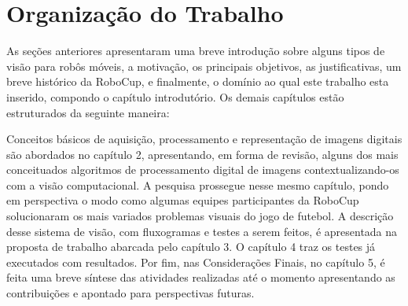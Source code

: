 \section{Organização do Trabalho}

As seções anteriores apresentaram uma breve introdução sobre alguns tipos de visão para robôs móveis, a motivação, os principais objetivos, as justificativas, um breve histórico da RoboCup, e finalmente, o domínio ao qual este trabalho esta inserido, compondo o capítulo introdutório. Os demais capítulos estão estruturados da seguinte maneira:

Conceitos básicos de aquisição, processamento e representação de imagens digitais são abordados no capítulo 2, apresentando, em forma de revisão, alguns dos mais conceituados algoritmos de processamento digital de imagens contextualizando-os com a visão computacional. A pesquisa prossegue nesse mesmo capítulo, pondo em perspectiva o modo como algumas equipes participantes da RoboCup solucionaram os mais variados problemas visuais do jogo de futebol. A descrição desse sistema de visão, com fluxogramas e testes a serem feitos, é apresentada na proposta de trabalho abarcada pelo capítulo 3. O capítulo 4 traz os testes já executados com resultados. Por fim, nas Considerações Finais, no capítulo 5, é feita uma breve síntese das atividades realizadas até o momento apresentando as contribuições e apontado para perspectivas futuras.

